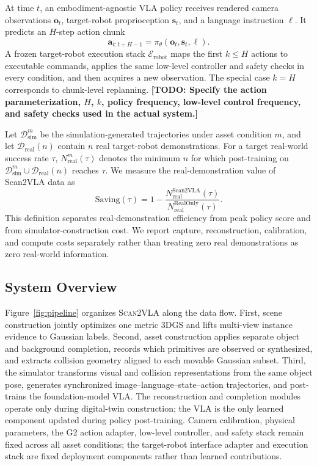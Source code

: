 \documentclass[letterpaper,10pt,conference]{ieeeconf}
\newcommand{\system}{\textsc{Scan2VLA}}
\newcommand{\todo}[1]{\textbf{[TODO: #1]}}
\begin{document}
At time $t$, an embodiment-agnostic VLA policy receives rendered camera
observations $\mathbf{o}_t$,
target-robot proprioception $\mathbf{s}_t$, and a language instruction $\ell$. It predicts
an $H$-step action chunk
\begin{equation}
  \mathbf{a}_{t:t+H-1}
  = \pi_{\theta}(\mathbf{o}_t,\mathbf{s}_t,\ell).
  \label{eq:vla-policy}
\end{equation}
A frozen target-robot execution stack $\mathcal{E}_{\mathrm{robot}}$ maps the first
$k\leq H$ actions to executable commands, applies the same low-level controller
and safety checks in every condition, and then acquires a new observation. The
special case $k=H$ corresponds to chunk-level replanning. \todo{Specify the
action parameterization, $H$, $k$, policy frequency, low-level control
frequency, and safety checks used in the actual system.}

Let $\mathcal{D}_{\mathrm{sim}}^m$ be the simulation-generated trajectories
under asset condition $m$, and let $\mathcal{D}_{\mathrm{real}}(n)$ contain $n$
real target-robot demonstrations. For a target real-world success rate $\tau$,
$N_{\mathrm{real}}^{m}(\tau)$ denotes the minimum $n$ for which post-training on
$\mathcal{D}_{\mathrm{sim}}^m\cup\mathcal{D}_{\mathrm{real}}(n)$ reaches
$\tau$. We measure the real-demonstration value of Scan2VLA data as
\begin{equation}
  \mathrm{Saving}(\tau) = 1 -
  \frac{N_{\mathrm{real}}^{\mathrm{Scan2VLA}}(\tau)}
       {N_{\mathrm{real}}^{\mathrm{RealOnly}}(\tau)}.
  \label{eq:saving}
\end{equation}
This definition separates real-demonstration efficiency from peak policy score
and from simulator-construction cost. We report capture, reconstruction,
calibration, and compute costs separately rather than treating zero real
demonstrations as zero real-world information.

\subsection{System Overview}
Figure~\ref{fig:pipeline} organizes \system{} along the data flow. First, scene
construction jointly optimizes one metric 3DGS and lifts multi-view instance
evidence to Gaussian labels. Second, asset construction applies separate object
and background completion, records which primitives are observed or synthesized,
and extracts collision geometry aligned to each movable Gaussian subset. Third,
the simulator transforms visual and collision representations from the same
object pose, generates synchronized image--language--state--action trajectories,
  and post-trains the foundation-model VLA. The reconstruction and completion modules operate only
during digital-twin construction; the VLA is the only learned component updated
during policy post-training. Camera calibration, physical parameters, the G2
action adapter, low-level controller, and safety stack remain fixed across all
  asset conditions; the target-robot interface adapter and execution stack are
  fixed deployment components rather than learned contributions.
\end{document}
